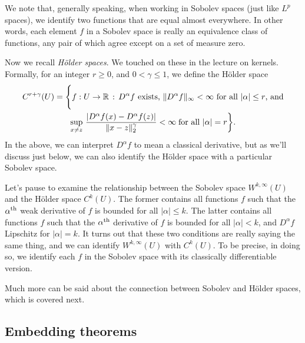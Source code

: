 \documentclass{article}
\begin{document}
We note that, generally speaking, when working in Sobolev spaces (just like
$L^p$ spaces), we identify two functions that are equal almost everywhere. In 
other words, each element $f$ in a Sobolev space is really an equivalence class
of functions, any pair of which agree except on a set of measure zero.

Now we recall \emph{H{\"o}lder spaces}. We touched on these in the lecture on 
kernels. Formally, for an integer $r \geq 0$, and $0 < \gamma \leq 1$, we define
the H{\"o}lder space
\begin{multline*}
C^{r+\gamma}(U) = \Bigg\{ f : U \to \mathbb{R} \,:\, \text{$D^\alpha f$ exists,
  $\|D^\alpha f\|_\infty < \infty$ for all $|\alpha| \leq r$, and} \\   
  \sup_{x \not= z} \, \frac{|D^\alpha f(x) - D^\alpha f(z)|}{\|x-z\|_2^\gamma} < 
  \infty \; \text{for all $|\alpha| = r$} \bigg\}.   
\end{multline*}
In the above, we can interpret $D^\alpha f$ to mean a classical derivative, but
as we'll discuss just below, we can also identify the H{\"o}lder space with a
particular Sobolev space. 

Let's pause to examine the relationship between the Sobolev space
$W^{k,\infty}(U)$ and the H{\"o}lder space $C^k(U)$. The former contains all
functions $f$ such that the $\alpha^{\text{th}}$ weak derivative of $f$ is bounded for
all $|\alpha| \leq k$. The latter contains all functions $f$ such that the
$\alpha^{\text{th}}$ derivative of $f$ is bounded for all $|\alpha| < k$, and $D^\alpha
f$ Lipschitz for $|\alpha| = k$. It turns out that these two conditions are
really saying the same thing, and we can identify $W^{k,\infty}(U)$ with
$C^k(U)$. To be precise,  in doing so, we identify each $f$ in the Sobolev space
with its classically differentiable version.

Much more can be said about the connection between Sobolev and H{\"o}lder
spaces, which is covered next.


\subsection{Embedding theorems}
\end{document}
